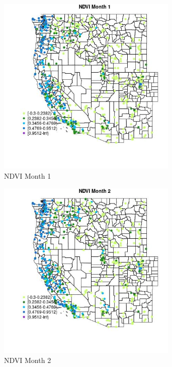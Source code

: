 \begin{figure} 
\centering  
\includegraphics[width=0.77\textwidth]{Code_Outputs/Report_ML_input_PM25_Step4_part_f_de_duplicated_aveswNAs_MapObsMo1NDVI.jpg} 
\caption{\label{fig:Report_ML_input_PM25_Step4_part_f_de_duplicated_aveswNAsMapObsMo1NDVI}NDVI Month 1} 
\end{figure} 
 

\begin{figure} 
\centering  
\includegraphics[width=0.77\textwidth]{Code_Outputs/Report_ML_input_PM25_Step4_part_f_de_duplicated_aveswNAs_MapObsMo2NDVI.jpg} 
\caption{\label{fig:Report_ML_input_PM25_Step4_part_f_de_duplicated_aveswNAsMapObsMo2NDVI}NDVI Month 2} 
\end{figure} 
 

